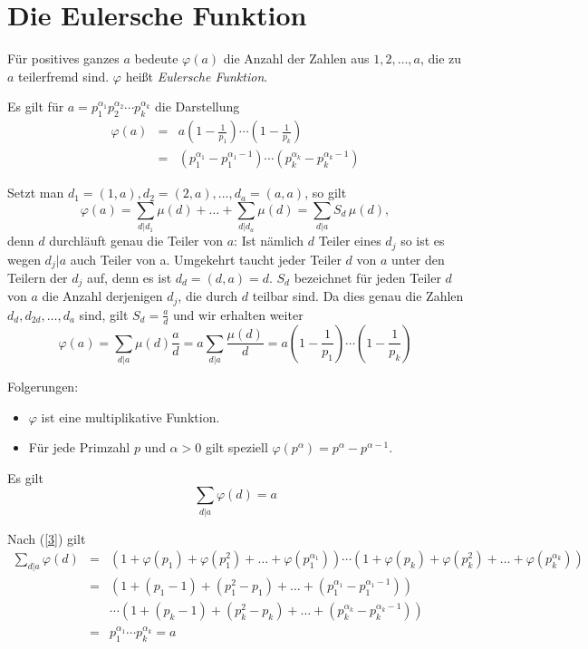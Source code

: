 \documentclass[11pt]{article}
\begin{document}
\section{Die Eulersche Funktion}
F\"{u}r positives ganzes $a$ bedeute $\varphi(a)$ die Anzahl der Zahlen aus
$1,2,\ldots,a$, die zu $a$ teilerfremd sind. $\varphi$ hei{\ss}t {\it
Eulersche Funktion}.
\begin{theorem}
Es gilt f\"{u}r $a=p_1^{\alpha_1} p_2^{\alpha_2}\cdots p_k^{\alpha_k}$ die
Darstellung
\begin{eqnarray*}
\varphi(a)&=&a\left(1-\frac{1}{p_1}\right)\cdots\left(1-\frac{1}{p_k}\right)\\
&=&(p_1^{\alpha_1}-p_1^{\alpha_1-1})\cdots(p_k^{\alpha_k}-p_k^{\alpha_k-1})
\end{eqnarray*}
\end{theorem}
\begin{beweis}
  Setzt man $d_1=(1,a),d_2=(2,a),\ldots,d_{a}=(a,a)$, so gilt
\[\varphi(a)=\sum_{d|d_1}\mu(d)+\ldots+\sum_{d|d_{a}}\mu(d)
=\sum_{d|a}S_d\,\mu(d),
\] 
denn $d$ durchl\"{a}uft genau die Teiler von $a$: Ist n\"{a}mlich $d$ Teiler
eines $d_j$ so ist es wegen $d_j|a$ auch Teiler von a.  Umgekehrt taucht jeder
Teiler $d$ von $a$ unter den Teilern der $d_j$ auf, denn es ist
$d_d=(d,a)=d$. $S_d$ bezeichnet f\"{u}r jeden Teiler $d$ von $a$ die Anzahl
derjenigen $d_j$, die durch $d$ teilbar sind. Da dies genau die Zahlen
$d_d,d_{2d},\ldots,d_a$ sind, gilt $S_d=\frac{a}{d}$ und wir erhalten weiter
\[\varphi(a)=\sum_{d|a}\mu(d)\frac{a}{d}=a\sum_{d|a}\frac{\mu(d)}{d}
=a(1-\frac{1}{p_1})\cdots(1-\frac{1}{p_k})
\] 
\end{beweis}

\noindent Folgerungen:
\begin{itemize}
\item $\varphi$ ist eine multiplikative Funktion.
\item F\"{u}r jede Primzahl $p$ und $\alpha>0$ gilt speziell
$\varphi(p^\alpha)=p^\alpha-p^{\alpha-1}$.
\end{itemize}
\begin{theorem}
Es gilt \[\sum_{d|a}\varphi(d)=a\]
\end{theorem}
\begin{beweis}
  Nach (\ref{3}) gilt
\begin{eqnarray*}
  \sum_{d|a}\varphi(d)&=&(1+\varphi(p_1)+\varphi(p_1^2)+\ldots
    +\varphi(p_1^{\alpha_1}))\cdots 
    (1+\varphi(p_k)+\varphi(p_k^2)+\ldots+\varphi(p_k^{\alpha_k}))\\
    &=&(1+(p_1-1)+(p_1^2-p_1)+\ldots+(p_1^{\alpha_1}-p_1^{\alpha_1-1}))
    \\&& \cdots 
    (1+(p_k-1)+(p_k^2-p_k)+\ldots+(p_k^{\alpha_k}-p_k^{\alpha_k-1}))\\
    &=&p_1^{\alpha_1}\cdots p_k^{\alpha_k}=a 
  \end{eqnarray*}
\end{beweis}
\end{document}

